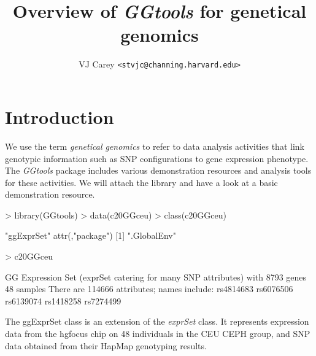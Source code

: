 \documentclass[12pt]{article}
\newcommand{\Rpackage}[1]{{\textit{#1}}}
\newcommand{\Rclass}[1]{{\textit{#1}}}
\begin{document}

\title{Overview of \Rpackage{GGtools} for genetical genomics}
\author{VJ Carey \texttt{<stvjc@channing.harvard.edu>}}
\maketitle

\section{Introduction}

We use the term \textit{genetical genomics} to refer to
data analysis activities that link genotypic information
such as SNP configurations to gene expression phenotype.
The \Rpackage{GGtools} package includes various
demonstration resources and analysis tools for these
activities.
We will attach the library and have a look at a basic
demonstration resource.
\begin{Schunk}
\begin{Sinput}
> library(GGtools)
> data(c20GGceu)
> class(c20GGceu)
\end{Sinput}
\begin{Soutput}
[1] "ggExprSet"
attr(,"package")
[1] ".GlobalEnv"
\end{Soutput}
\begin{Sinput}
> c20GGceu
\end{Sinput}
\begin{Soutput}
GG Expression Set (exprSet catering for many SNP attributes) with 
	8793 genes
	48 samples
There are  114666  attributes; names include:
rs4814683 rs6076506 rs6139074 rs1418258 rs7274499 
\end{Soutput}
\end{Schunk}
The ggExprSet class is an extension of the
\Rclass{exprSet} class.  It represents expression
data from the hgfocus chip on 48 individuals in the CEU
CEPH group, and SNP data obtained from their HapMap genotyping
results.
\end{document}
